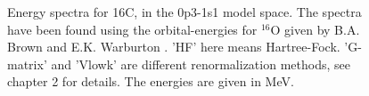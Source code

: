 \begin{figure}[htbp]
\begin{center}
\begin{picture}
\end{picture}
\end{center}
\caption{Energy spectra for 16C, in the 0p3-1s1 model space. The spectra have been found using the orbital-energies for $^{16}$O given by B.A. Brown and E.K. Warburton \citep{16CLifetime}. 'HF' here means Hartree-Fock. 'G-matrix' and 'Vlowk' are different renormalization methods, see chapter 2 for details. The energies are given in MeV.}
\label{fig:16C_brown_3pert_1s1}
\end{figure}



